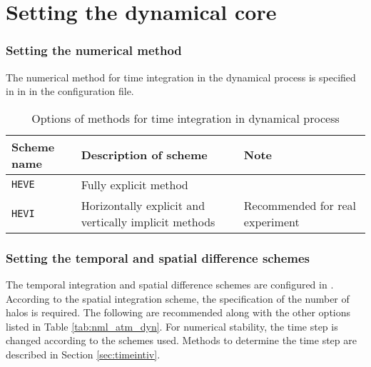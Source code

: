 \section{Setting the dynamical core} \label{sec:atmos_dyn}

\subsubsection{Setting the numerical method}  %
The numerical method for time integration in the dynamical process is specified in  in  in the configuration file.

\begin{table}[bth]
\begin{center}
  \caption{Options of methods for time integration in dynamical process}
  \label{tab:nml_dyn}
  \begin{tabularx}{150mm}{llX} \hline
    \rowcolor[gray]{0.9}  Scheme name & Description of scheme & Note\\ \hline
      \verb|HEVE|  & Fully explicit method & \\
      \verb|HEVI|  & Horizontally explicit and vertically implicit methods & Recommended for real experiment\\
    \hline
  \end{tabularx}
\end{center}
\end{table}


\subsubsection{Setting the temporal and spatial difference schemes} %

The temporal integration and spatial difference schemes are configured in . According to the spatial integration scheme, the specification of the number of halos is required. The following are recommended along with the other options listed in Table \ref{tab:nml_atm_dyn}. For numerical stability, the time step is changed according to the schemes used. Methods to determine the time step are described in Section \ref{sec:timeintiv}.

